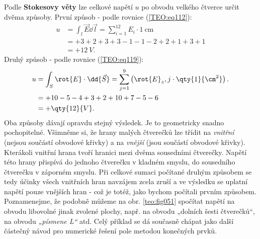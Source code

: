 \begin{mdframed}[style=mdexam]
\begin{example}
  Podle \textbf{Stokesovy věty} lze celkové napětí \(u\) po obvodu velkého čtverce určit dvěma 
  způsoby. První způsob - podle rovnice (\ref{TEO:eq112}):
  \begin{align*}
    u &= \int_l\vec{E}\dd{\vec{l}} = \sum\limits_{i=1}^{12}E_i\cdot\qty{1}{\cm}     \\
      &= +3 +2 +3 +3 - 1 - 1 -2 + 2 + 1 + 3 + 1                                \\
      &= + \qty{12}{V}.
  \end{align*}
  Druhý způsob - podle rovnice (\ref{TEO:eq119}):
  \begin{align*}
    u &= \int_S\rot{E} \cdot \dd{\vec{S}} 
       = \sum\limits_{j=1}^{9}\left(\rot{E}_z,j\cdot\qty{1}{\cm^2}\right).      \\
      &= + 10 - 5 - 4 + 3 + 2 + 10 + 7 - 5 - 6                                 \\
      &= + \qty{12}{V}. 
  \end{align*}
  Oba způsoby dávají opravdu stejný výsledek. Je to geometricky snadno pochopitelné. Všimněme 
  si, že hrany malých čtverečků lze třídit na \emph{vnitřní} (nejsou součástí obvodové křivky) a na 
  \emph{vnější} (jsou součástí obvodové křivky). Kterákoli vnitřní hrana tvoří hranici mezi dvěma 
  sousedními čtverečky. Napětí této hrany přispívá do jednoho čtverečku v kladném smyslu, do 
  sousedního čtverečku v záporném smyslu. Při celkové sumaci počítané druhým způsobem se tedy 
  účinky všech vnitřních hran navzájem zcela zruší a ve výsledku se uplatní napětí pouze vnějších 
  hran - což je totéž, jako bychom počítali prvním způsobem. Poznamenejme, že podobně můžeme na 
  obr. \ref{teo:fig051} spočítat napětí na obvodu libovolné jinak zvolené plochy, 
  např. na obvodu „dolních šesti čtverečků“, na obvodu \emph{„písmene L“} atd. Celý příklad se dá 
  současně chápat jako další částečný návod pro numerické řešení pole metodou konečných prvků.
\end{example}
\end{mdframed}
